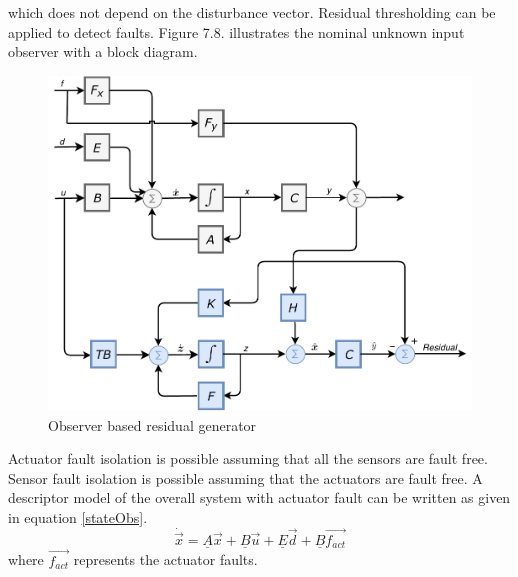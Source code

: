 which does not depend on the disturbance vector. Residual thresholding can be applied to detect faults.
Figure 7.8. illustrates the nominal unknown input observer with a block diagram. 
\begin{figure}[H]
	\centering
	\includegraphics[width=0.8\linewidth]{figures/UIO_new}
	\caption{Observer based residual generator}
	\label{fig:residualobs}
\end{figure}



Actuator fault isolation is possible assuming that all the sensors are fault free. Sensor fault isolation is possible assuming that the actuators are fault free. A descriptor model of the overall system with actuator fault can be written as given in equation \ref{stateObs}.
\begin{equation}
\dot{\vec{x}} = \underline A\vec{x}+\underline B \vec{u}+\underline E\vec{d} + \underline B\vec{f_{act}}
\label{stateObs34}
\end{equation}
where $\vec{f_{act}}$ represents the actuator faults. 

